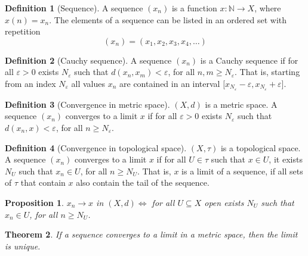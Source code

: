 \documentclass{article}
\newcommand{\f}[3]{#1 : #2 \rightarrow #3}
\theoremstyle{definition}
\newtheorem{definition}{Definition}[section]
\theoremstyle{definition}
\theoremstyle{plain}
\newtheorem{theorem}{Theorem}[section]
\theoremstyle{plain}
\theoremstyle{plain}
\theoremstyle{plain}
\newtheorem{proposition}[theorem]{Proposition}
\theoremstyle{definition}
\theoremstyle{remark}
\theoremstyle{remark}
\theoremstyle{remark}
\theoremstyle{remark}
\newcommand{\N}{\mathbb{N}}
\newcommand{\E}{\varepsilon}
\begin{document}
\begin{definition}[Sequence]
  A sequence $(x_n)$ is a function $\f{x}{\N}{X}$, where $x(n) = x_n$. The elements of a sequence can be listed in an ordered set with repetition
  \[
  (x_n) = (x_1, x_2, x_3, x_4, \hdots)
  \]
\end{definition}





\begin{definition}[Cauchy sequence]
  A sequence $(x_n)$ is a Cauchy sequence if for all $\E > 0$ exists $N_\E$ such that $d(x_n,x_m) < \E$, for all $n, m \geq N_\E$. That is, starting from an index $N_\E$ all values $x_n$ are contained in an interval ${[}x_{N_\E} - \E, x_{N_\E} + \E{]}$.
\end{definition}



\begin{definition}[Convergence in metric space]
  $(X, d)$ is a metric space. A sequence $(x_n)$ converges to a limit $x$ if for all $\E > 0$ exists $N_\E$ such that $d(x_n,x) < \E$, for all $n \geq N_\E$.
\end{definition}



\begin{definition}[Convergence in topological space]
  $(X, \tau)$ is a topological space. A sequence $(x_n)$ converges to a limit $x$ if for all $U \in \tau$ such that $x \in U$, it exists $N_U$ such that $x_n \in U$, for all $n \geq N_U$. That is, $x$ is a limit of a sequence, if all sets of $\tau$ that contain $x$ also contain the tail of the sequence.
\end{definition}



\begin{proposition}
  $x_n \to x$ in $(X, d) \iff$ for all $U \subseteq X$ open exists $N_U$ such that $x_n \in U$, for all $n \geq N_U$.
\end{proposition}



\begin{theorem}
  If a sequence converges to a limit in a metric space, then the limit is unique.
\end{theorem}
\end{document}
